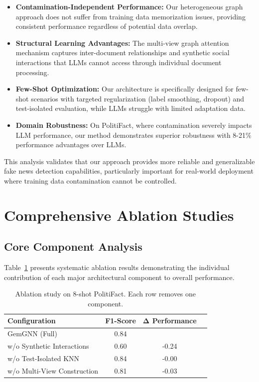\begin{itemize}
    \item \textbf{Contamination-Independent Performance:} Our heterogeneous graph approach does not suffer from training data memorization issues, providing consistent performance regardless of potential data overlap.
    
    \item \textbf{Structural Learning Advantages:} The multi-view graph attention mechanism captures inter-document relationships and synthetic social interactions that LLMs cannot access through individual document processing.
    
    \item \textbf{Few-Shot Optimization:} Our architecture is specifically designed for few-shot scenarios with targeted regularization (label smoothing, dropout) and test-isolated evaluation, while LLMs struggle with limited adaptation data.
    
    \item \textbf{Domain Robustness:} On PolitiFact, where contamination severely impacts LLM performance, our method demonstrates superior robustness with 8-21\% performance advantages over LLMs.
\end{itemize}

This analysis validates that our approach provides more reliable and generalizable fake news detection capabilities, particularly important for real-world deployment where training data contamination cannot be controlled.

\section{Comprehensive Ablation Studies}

\subsection{Core Component Analysis}

Table~\ref{tab:ablation_components} presents systematic ablation results demonstrating the individual contribution of each major architectural component to overall performance.

\begin{table}[htbp]
\centering
\caption{Ablation study on 8-shot PolitiFact. Each row removes one component.}
\label{tab:ablation_components}
\begin{tabular}{lccc}
\toprule
\textbf{Configuration} & \textbf{F1-Score} & \textbf{Δ Performance} \\
\midrule
GemGNN (Full) & 0.84 &  \\
\midrule
w/o Synthetic Interactions & 0.60 & -0.24 \\
w/o Test-Isolated KNN & 0.84 & -0.00 \\
w/o Multi-View Construction & 0.81 & -0.03 \\
\midrule
\bottomrule
\end{tabular}
\end{table}

